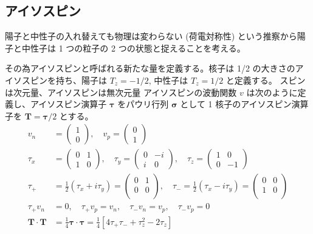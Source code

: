 \documentclass[uplatex,dvipdfmx,a4paper,11pt]{jlreq}
\numberwithin{equation}{section}
\theoremstyle{definition}
\begin{document}
\subsection{アイソスピン}
陽⼦と中性⼦の⼊れ替えても物理は変わらない (荷電対称性) という推察から陽子と中性子は 1 つの粒子の 2 つの状態と捉えることを考える。

その為アイソスピンと呼ばれる新たな量を定義する。核子は 1/2 の大きさのアイソスピンを持ち、陽子は $T_z = -1/2$, 中性子は $T_z = 1/2$ と定義する。
スピンは次元量、アイソスピンは無次元量
アイソスピンの波動関数 $v$ は次のように定義し、アイソスピン演算子 $\bm{\tau}$ をパウリ行列 $\bm{\sigma}$ として 1 核子のアイソスピン演算子を $\bm{T} = \bm{\tau}/2$ とする。
\begin{align}
  v_n               & = \begin{pmatrix}
                          1 \\ 0
                        \end{pmatrix}, \quad
  v_p = \begin{pmatrix}
          0 \\ 1
        \end{pmatrix}                                                                                       \\
  \tau_x            & = \begin{pmatrix}
                          0 & 1 \\
                          1 & 0
                        \end{pmatrix}, \quad
  \tau_y = \begin{pmatrix}
             0 & -i \\
             i & 0
           \end{pmatrix}, \quad
  \tau_z = \begin{pmatrix}
             1 & 0  \\
             0 & -1
           \end{pmatrix}                                                                                    \\
  \tau_+            & = \frac{1}{2}(\tau_x + i\tau_y) = \begin{pmatrix}
                                                          0 & 1 \\
                                                          0 & 0 \\
                                                        \end{pmatrix}, \quad
  \tau_- = \frac{1}{2}(\tau_x - i\tau_y) = \begin{pmatrix}
                                             0 & 0 \\
                                             1 & 0 \\
                                           \end{pmatrix}                                                    \\
  \tau_+v_n         & = 0, \quad \tau_+v_p = v_n, \quad \tau_-v_n = v_p, \quad \tau_-v_p = 0                 \\
  \bm{T}\cdot\bm{T} & = \frac{1}{4}\bm{\tau}\cdot\bm{\tau} = \frac{1}{4}[4\tau_+\tau_- + \tau_z^2 - 2\tau_z]
\end{align}
\end{document}

